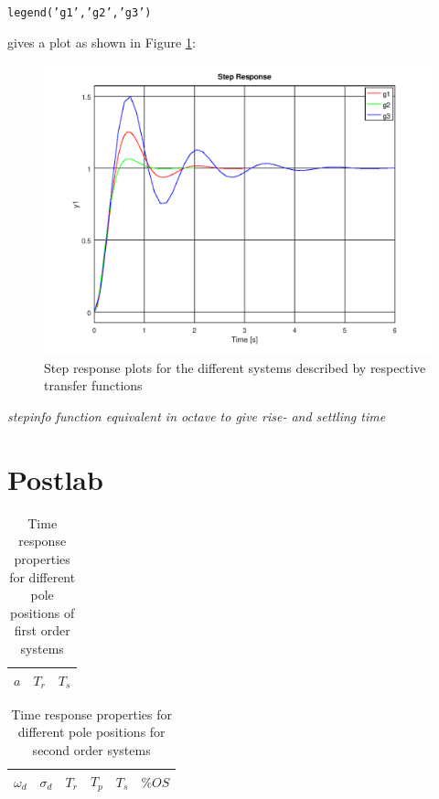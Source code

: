 \documentclass[a4paper, 12pt]{article}
\begin{document}
		\texttt{legend('g1','g2','g3')}



		gives a plot as shown in Figure \ref{plot_question_2_lab}:

		\begin{figure}[H]
			\includegraphics[width=\textwidth]{img/Question_2_Lab_Plots.png}
			\caption{Step response plots for the different systems described by respective transfer functions}
			\label{plot_question_2_lab}
		\end{figure}

		\textit{stepinfo function equivalent in octave to give rise- and settling time}


	\section{Postlab} %
	\label{sec:postlab}
		\begin{table}[H]
			\begin{tabularx}{\textwidth}{X X X}
				\toprule
				$a$ & $T_r$ & $T_s$ \\
				\midrule

				\bottomrule
			\end{tabularx}
			\caption{Time response properties for different pole positions of first order systems}
		\end{table}

		\begin{table}[H]
			\begin{tabularx}{\textwidth}{X X X X X X}
			\toprule
			$\omega_d$ & $\sigma_d$ & $T_r$ & $T_p$ & $T_s$ & $\%OS$ \\
			\bottomrule
			\end{tabularx}
			\caption{Time response properties for different pole positions for second order systems}
		\end{table}
\end{document}
